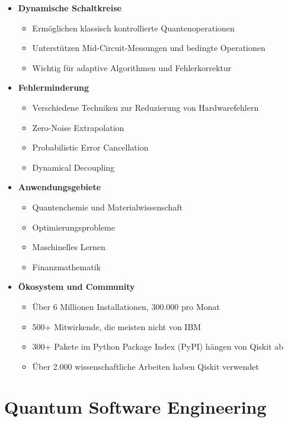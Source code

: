 \begin{itemize}
    \item \textbf{Dynamische Schaltkreise}
    \begin{itemize}
        \item Ermöglichen klassisch kontrollierte Quantenoperationen
        \item Unterstützen Mid-Circuit-Messungen und bedingte Operationen
        \item Wichtig für adaptive Algorithmen und Fehlerkorrektur
    \end{itemize}
    
    \item \textbf{Fehlerminderung}
    \begin{itemize}
        \item Verschiedene Techniken zur Reduzierung von Hardwarefehlern
        \item Zero-Noise Extrapolation
        \item Probabilistic Error Cancellation
        \item Dynamical Decoupling
    \end{itemize}
    
    \item \textbf{Anwendungsgebiete}
    \begin{itemize}
        \item Quantenchemie und Materialwissenschaft
        \item Optimierungsprobleme
        \item Maschinelles Lernen
        \item Finanzmathematik
    \end{itemize}
    
    \item \textbf{Ökosystem und Community}
    \begin{itemize}
        \item Über 6 Millionen Installationen, 300.000 pro Monat
        \item 500+ Mitwirkende, die meisten nicht von IBM
        \item 300+ Pakete im Python Package Index (PyPI) hängen von Qiskit ab
        \item Über 2.000 wissenschaftliche Arbeiten haben Qiskit verwendet
    \end{itemize}
\end{itemize}



\section{Quantum Software Engineering}

